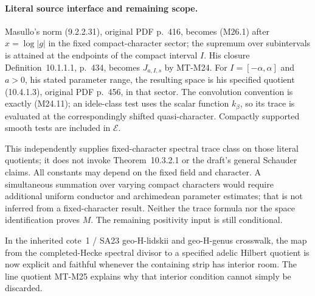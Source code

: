 \paragraph{Literal source interface and remaining scope.}
Masullo's norm (9.2.2.31), original PDF p.~416, becomes
(M26.1) after $x=\log|g|$ in the fixed compact-character
sector; the supremum over subintervals is attained at
the endpoints of the compact interval $I$. His closure
Definition~10.1.1.1, p.~434, becomes $J_{a,I,s}$ by
MT-M24. For $I=[-\alpha,\alpha]$ and $a>0$, his stated
parameter range, the resulting space
is his specified quotient (10.4.1.3), original PDF p.~456,
in that sector. The convolution convention is exactly
(M24.11); an idele-class test uses the scalar function
$k_\beta$, so its trace is evaluated at the correspondingly
shifted quasi-character. Compactly supported smooth tests
are included in $\mathcal E$.

This independently supplies fixed-character spectral
trace class on those literal quotients; it does not invoke
Theorem~10.3.2.1 or the draft's general Schauder claims.
All constants may depend on the fixed field and character.
A simultaneous summation over varying compact characters
would require additional uniform conductor and archimedean
parameter estimates; that is not inferred from a
fixed-character result. Neither the trace formula nor
the space identification proves $M$. The remaining
positivity input is still conditional.

In the inherited cote~1 / SA23 geo-H-lidskii and geo-H-genus
crosswalk, the map from the completed-Hecke spectral
divisor to a specified adelic Hilbert quotient is now
explicit and faithful whenever the containing strip has
interior room. The line quotient MT-M25 explains why
that interior condition cannot simply be discarded.
